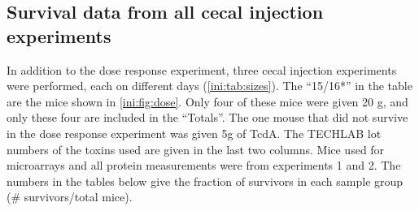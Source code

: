 \FloatBarrier

\subsection{Survival data from all cecal injection experiments}

\begin{table}[ht]
\centering
\begin{adjustwidth}{-1cm}{}
\end{adjustwidth}
\caption{Cecal injection experiments }
\label{ini:tab:sizes}
\end{table}

In addition to the dose response experiment, three cecal injection experiments were performed, each on
different days (\autoref{ini:tab:sizes}). The ``15/16*'' in the table are the mice shown in
\autoref{ini:fig:dose}. Only four of these mice were given 20 \textmu{}g, and
only these four are included in the ``Totals''. The one mouse that did not
survive in the dose response experiment was given 5\textmu{}g of TcdA.
The TECHLAB\textsuperscript{\textregistered{}} lot numbers 
of the toxins used are given in the last two columns. Mice used for microarrays
and all protein measurements were from experiments 1 and 2. The numbers in the tables
below give the fraction of survivors in each sample group (\# survivors/total mice).

